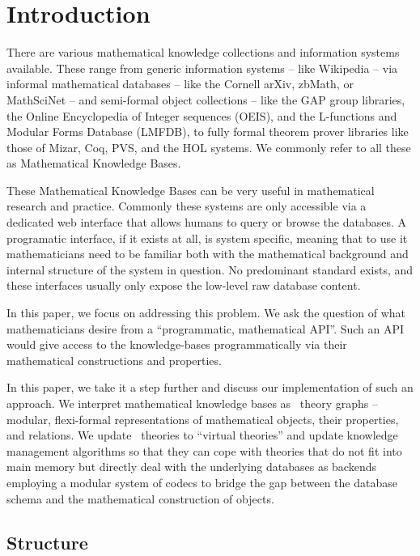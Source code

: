 \section{Introduction}\label{sec:intro}

There are various mathematical knowledge collections and information systems available. 
These range from generic information systems -- like Wikipedia -- via informal mathematical databases -- like the Cornell arXiv, zbMath, or MathSciNet -- and semi-formal object collections -- like the GAP group libraries, the Online Encyclopedia of Integer sequences (OEIS), and the L-functions and Modular Forms Database (LMFDB), to fully formal theorem prover libraries like those of Mizar, Coq, PVS, and the HOL systems. 
We commonly refer to all these as Mathematical Knowledge Bases. 

These Mathematical Knowledge Bases can be very useful in mathematical research and practice. 
Commonly these systems are only accessible via a dedicated web interface that allows humans to query or browse the databases. 
A programatic interface, if it exists at all, is system specific, meaning that to use it mathematicians need to be familiar both with the mathematical background and internal structure of the system in question. 
No predominant standard exists, and these interfaces usually only expose the low-level raw database content. 

In this paper, we focus on addressing this problem. 
We ask the question of what mathematicians desire from a ``programmatic, mathematical API''. 
Such an API would give access to the knowledge-bases programmatically via their mathematical constructions and properties. 

In this paper, we take it a step further and discuss our implementation of such an approach. 
We interpret mathematical knowledge bases as \omdocmmt\ theory graphs -- modular, flexi-formal representations of mathematical objects, their properties, and relations. 
We update \omdocmmt\ theories to ``virtual theories'' and update knowledge management algorithms so that they can cope with theories that do not fit into main memory but directly deal with the underlying databases as backends employing a modular system of codecs to bridge the gap between the database schema and the mathematical construction of objects.

\subsection*{Structure}\label{sec:intro:struct}

